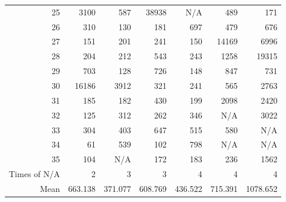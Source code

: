 \documentclass[11pt]{article}
\begin{document}
\begin{table}[htb]
\begin{tabular}{rrrrrrr}
25 & 3100 & 587 & 38938 & N/A & 489 & 171\\
26 & 310 & 130 & 181 & 697 & 479 & 676\\
27 & 151 & 201 & 241 & 150 & 14169 & 6996\\
28 & 204 & 212 & 543 & 243 & 1258 & 19315\\
29 & 703 & 128 & 726 & 148 & 847 & 731\\
30 & 16186 & 3912 & 321 & 241 & 565 & 2763\\
31 & 185 & 182 & 430 & 199 & 2098 & 2420\\
32 & 125 & 312 & 262 & 346 & N/A & 3022\\
33 & 304 & 403 & 647 & 515 & 580 & N/A\\
34 & 61 & 539 & 102 & 798 & N/A & N/A\\
35 & 104 & N/A & 172 & 183 & 236 & 1562\\
\hline
Times of N/A & 2 & 3 & 3 & 4 & 4 & 4\\
Mean & 663.138 & 371.077 & 608.769 & 436.522 & 715.391 & 1078.652\\
\end{tabular}
\end{table}
\end{document}
